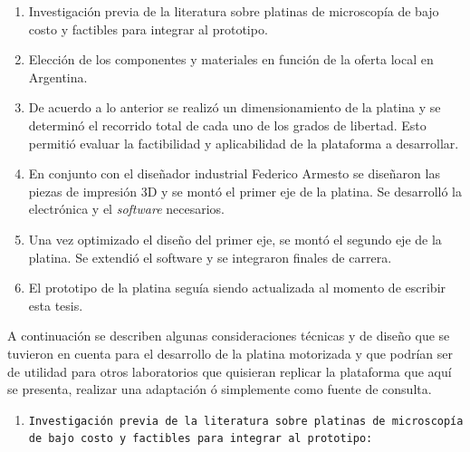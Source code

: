 \begin{enumerate}
\item Investigación previa de la literatura sobre platinas de microscopía de bajo costo y factibles para integrar al prototipo.
\item Elección de los componentes y materiales en función de la oferta local en Argentina.
\item De acuerdo a lo anterior se realizó un dimensionamiento de la platina y se determinó el recorrido total de cada uno de los grados de libertad. Esto permitió evaluar la factibilidad y aplicabilidad de la plataforma a desarrollar.
\item En conjunto con el diseñador industrial Federico Armesto se diseñaron las piezas de impresión 3D y se montó el primer eje de la platina. Se desarrolló la electrónica y el \textit{software} necesarios.
\item Una vez optimizado el diseño del primer eje, se montó el segundo eje de la platina. Se extendió el software y se integraron finales de carrera.
\item El prototipo de la platina seguía siendo actualizada al momento de escribir esta tesis.
\end{enumerate}

A continuación se describen algunas consideraciones técnicas y de diseño que se tuvieron en cuenta para el desarrollo de la platina motorizada y que podrían ser de utilidad para otros laboratorios que quisieran replicar la plataforma que aquí se presenta, realizar una adaptación ó simplemente como fuente de consulta.


\begin{enumerate}
\item \texttt{Investigación previa de la literatura sobre platinas de microscopía de bajo costo y factibles para integrar al prototipo:}
\end{enumerate}

